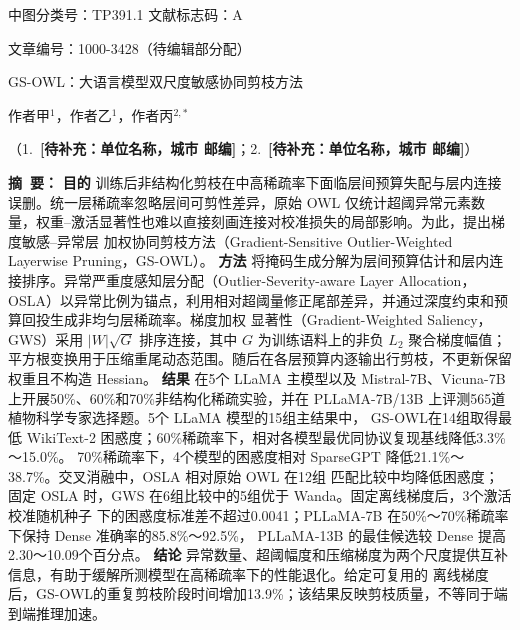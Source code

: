 \documentclass[UTF8,fontset=fandol]{ctexart}
\newcommand{\method}{GS-OWL}
\newcommand{\placeholder}[1]{\textbf{[待补充：#1]}}
\begin{document}

\begingroup
\setlength{\parindent}{0pt}
\noindent
\begin{minipage}{0.48\textwidth}
 中图分类号：TP391.1 \qquad 文献标志码：A
\end{minipage}
\hfill
\begin{minipage}{0.48\textwidth}
\raggedleft{} 文章编号：1000-3428（待编辑部分配）
\end{minipage}

\vspace{8pt}
\begin{center}
{\heiti{} GS-OWL：大语言模型双尺度敏感协同剪枝方法\par}
\vspace{7pt}
{ 作者甲$^{1}$，作者乙$^{1}$，作者丙$^{2,*}$\par}
\vspace{4pt}
{
（1.\ \placeholder{单位名称，城市 邮编}；2.\ \placeholder{单位名称，城市 邮编}）\par}
\end{center}

\vspace{5pt}
\noindent\textbf{摘\ 要：}
\textbf{目的}\quad
训练后非结构化剪枝在中高稀疏率下面临层间预算失配与层内连接误删。统一层稀疏率忽略层间可剪性差异，原始 OWL
仅统计超阈异常元素数量，权重--激活显著性也难以直接刻画连接对校准损失的局部影响。为此，提出梯度敏感--异常层
加权协同剪枝方法（Gradient-Sensitive Outlier-Weighted Layerwise Pruning，\method）。
\textbf{方法}\quad
将掩码生成分解为层间预算估计和层内连接排序。异常严重度感知层分配（Outlier-Severity-aware Layer Allocation，
OSLA）以异常比例为锚点，利用相对超阈量修正尾部差异，并通过深度约束和预算回投生成非均匀层稀疏率。梯度加权
显著性（Gradient-Weighted Saliency，GWS）采用 $\lvert W\rvert\sqrt{G}$ 排序连接，其中 $G$ 为训练语料上的非负
$L_2$ 聚合梯度幅值；平方根变换用于压缩重尾动态范围。随后在各层预算内逐输出行剪枝，不更新保留权重且不构造 Hessian。
\textbf{结果}\quad
在5个 LLaMA 主模型以及 Mistral-7B、Vicuna-7B 上开展50\%、60\%和70\%非结构化稀疏实验，并在
PLLaMA-7B/13B 上评测565道植物科学专家选择题。5个 LLaMA 模型的15组主结果中，
\method 在14组取得最低 WikiText-2 困惑度；60\%稀疏率下，相对各模型最优同协议复现基线降低3.3\%～15.0\%。
70\%稀疏率下，4个模型的困惑度相对 SparseGPT 降低21.1\%～38.7\%。交叉消融中，OSLA 相对原始 OWL 在12组
匹配比较中均降低困惑度；固定 OSLA 时，GWS 在6组比较中的5组优于 Wanda。固定离线梯度后，3个激活校准随机种子
下的困惑度标准差不超过0.0041；PLLaMA-7B 在50\%～70\%稀疏率下保持 Dense 准确率的85.8\%～92.5\%，
PLLaMA-13B 的最佳候选较 Dense 提高2.30～10.09个百分点。
\textbf{结论}\quad
异常数量、超阈幅度和压缩梯度为两个尺度提供互补信息，有助于缓解所测模型在高稀疏率下的性能退化。给定可复用的
离线梯度后，\method 的重复剪枝阶段时间增加13.9\%；该结果反映剪枝质量，不等同于端到端推理加速。
\end{document}
